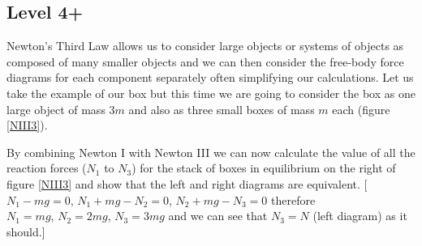 \subsection{Level 4+}
Newton's Third Law allows us to consider large objects or systems of objects as composed of many smaller objects and we can then consider the free-body force diagrams for each component separately  often simplifying our calculations.\nl
Let us take the example of our box but this time we are going to consider the box as one large object of mass $3m$ and also as three small boxes of mass $m$ each (figure \ref{NIII3}).\nl

\noindent By combining Newton I with Newton III we can now calculate the value of all the reaction forces ($N_1$ to $N_3$) for the stack of boxes in equilibrium on the right of figure \ref{NIII3} and show that the left and right diagrams are equivalent.\nl
\color{red}[$N_1-mg=0$, $N_1+mg-N_2=0$, $N_2+mg-N_3=0$ therefore \\
$N_1=mg$, $N_2=2mg$, $N_3=3mg$ and we can see that $N_3=N$ (left diagram) as it should.]\color{black}





